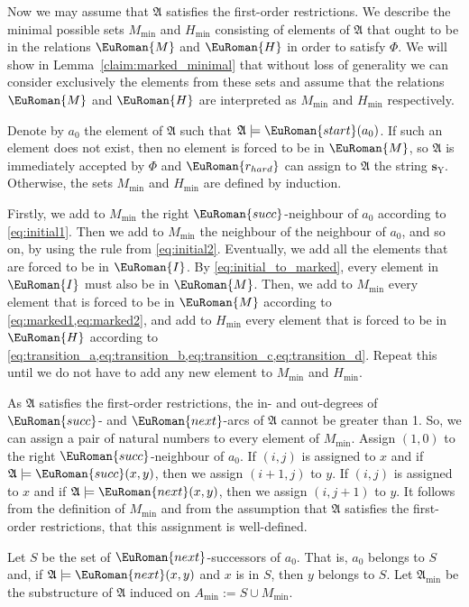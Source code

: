 \documentclass[10pt,a4paper]{amsart}
\theoremstyle{plain}
\theoremstyle{definition}
\numberwithin{equation}{section}
\newcommand{\eurm}[1]{\EuRoman{#1}} %
\newcommand{\structure}[1]{\mathfrak{#1}} %
\newcommand{\tuple}[1]{\mathbf{#1}} %
\newcommand{\rel}[1]{\eurm{#1}} %
\newcommand{\func}[1]{\eurm{#1}}  %
\begin{document}
Now we may assume that $\structure{A}$ satisfies the first-order restrictions.
We describe the minimal possible sets $M_{\min}$ and $H_{\min}$ consisting of elements of $\structure{A}$ that ought to be in the relations $\rel{M}$ and $\rel{H}$ in order to satisfy $\Phi$.
We will show in Lemma~\ref{claim:marked_minimal} that without loss of generality we can consider exclusively the elements from these sets and  assume that the relations $\rel{M}$ and $\rel{H}$ are interpreted as $M_{\min}$ and $H_{\min}$ respectively.

Denote by $a_0$ the element of $\structure{A}$ such that $\structure{A}\models\rel{start}(a_0)$.
If such an element does not exist, then no element is forced to be in $\rel{M}$, so $\structure{A}$ is immediately accepted by $\Phi$ and $\func{r_{hard}}$ can assign to $\structure{A}$ the string $\tuple{s}_\mathrm{Y}$.
Otherwise, the sets $M_{\min}$ and $H_{\min}$ are defined by induction.

Firstly, we add to $M_{\min}$ the right $\rel{succ}$-neighbour of $a_0$ according to \cref{eq:initial1}. 
Then we add to $M_{\min}$ the neighbour of the neighbour of $a_0$, and so on, by using the rule from \cref{eq:initial2}.
Eventually, we add all the elements that are forced to be in $\rel{I}$.
By \cref{eq:initial_to_marked}, every element in $\rel{I}$ must also be in $\rel{M}$.
Then, we add to $M_{\min}$ every element that is forced to be in $\rel{M}$ according to \cref{eq:marked1,eq:marked2}, and add to $H_{\min}$ every element that is forced to be in $\rel{H}$ according to \cref{eq:transition_a,eq:transition_b,eq:transition_c,eq:transition_d}.
Repeat this until we do not have to add any new element to $M_{\min}$ and $H_{\min}$.

As $\structure{A}$ satisfies the first-order restrictions, the in- and out-degrees of $\rel{succ}$- and $\rel{next}$-arcs of $\structure{A}$ cannot be greater than 1.
So, we can assign a pair of natural numbers to every element of $M_{\min}$.
Assign $(1,0)$ to the right $\rel{succ}$-neighbour of $a_0$.
If $(i,j)$ is assigned to $x$ and if $\structure{A}\models\rel{succ}(x,y)$, then we assign $(i+1,j)$ to $y$.
If $(i,j)$ is assigned to $x$ and if $\structure{A}\models\rel{next}(x,y)$, then we assign $(i,j+1)$ to $y$.
It follows from the definition of $M_{\min}$ and from the assumption that $\structure{A}$ satisfies the first-order restrictions, that this assignment is well-defined.


Let $S$ be the set of $\rel{next}$-successors of $a_0$.
That is, $a_0$ belongs to $S$ and, if $\structure{A}\models\rel{next}(x,y)$ and $x$ is in $S$, then $y$ belongs to $S$.
Let $\structure{A}_{\min}$ be the substructure of $\structure{A}$ induced on $A_{\min}:=S\cup M_{\min}$.
\end{document}
